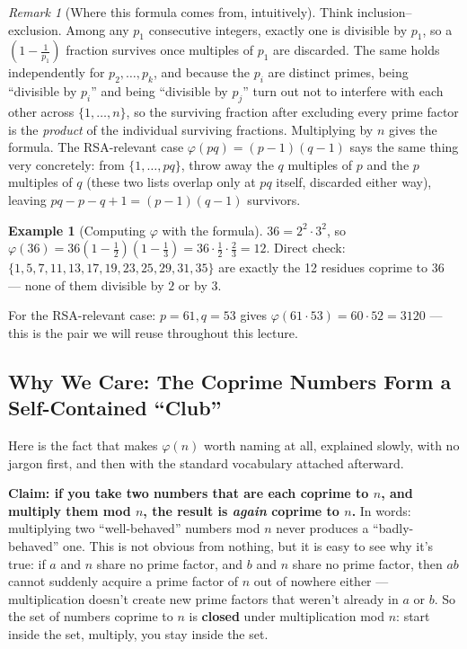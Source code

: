 \documentclass[11pt]{article}
\theoremstyle{definition}
\newtheorem{example}[theorem]{Example}
\theoremstyle{remark}
\newtheorem{remark}[theorem]{Remark}
\begin{document}
\begin{remark}[Where this formula comes from, intuitively]
Think inclusion--exclusion. Among any $p_1$ consecutive integers, exactly one is divisible by $p_1$, so a $\left(1-\frac1{p_1}\right)$ fraction survives once multiples of $p_1$ are discarded. The same holds independently for $p_2,\dots,p_k$, and because the $p_i$ are distinct primes, being ``divisible by $p_i$'' and being ``divisible by $p_j$'' turn out not to interfere with each other across $\{1,\dots,n\}$, so the surviving fraction after excluding every prime factor is the \emph{product} of the individual surviving fractions. Multiplying by $n$ gives the formula. The RSA-relevant case $\varphi(pq)=(p-1)(q-1)$ says the same thing very concretely: from $\{1,\dots,pq\}$, throw away the $q$ multiples of $p$ and the $p$ multiples of $q$ (these two lists overlap only at $pq$ itself, discarded either way), leaving $pq-p-q+1=(p-1)(q-1)$ survivors.
\end{remark}

\begin{example}[Computing $\varphi$ with the formula]
$36 = 2^2 \cdot 3^2$, so $\varphi(36) = 36\left(1 - \frac12\right)\left(1 - \frac13\right) = 36 \cdot \frac12 \cdot \frac23 = 12$. Direct check: $\{1,5,7,11,13,17,19,23,25,29,31,35\}$ are exactly the 12 residues coprime to 36 — none of them divisible by $2$ or by $3$.

For the RSA-relevant case: $p=61, q=53$ gives $\varphi(61 \cdot 53) = 60 \cdot 52 = 3120$ — this is the pair we will reuse throughout this lecture.
\end{example}

\subsection{Why We Care: The Coprime Numbers Form a Self-Contained ``Club''}


Here is the fact that makes $\varphi(n)$ worth naming at all, explained slowly, with no jargon first, and then with the standard vocabulary attached afterward.

\textbf{Claim: if you take two numbers that are each coprime to $n$, and multiply them mod $n$, the result is \emph{again} coprime to $n$.} In words: multiplying two ``well-behaved'' numbers mod $n$ never produces a ``badly-behaved'' one. This is not obvious from nothing, but it is easy to see why it's true: if $a$ and $n$ share no prime factor, and $b$ and $n$ share no prime factor, then $ab$ cannot suddenly acquire a prime factor of $n$ out of nowhere either — multiplication doesn't create new prime factors that weren't already in $a$ or $b$. So the set of numbers coprime to $n$ is \textbf{closed} under multiplication mod $n$: start inside the set, multiply, you stay inside the set.
\end{document}
